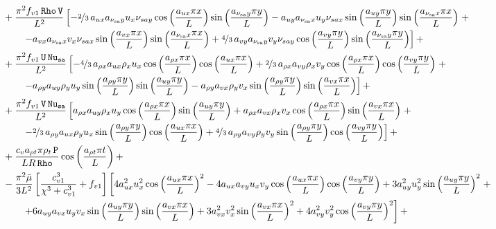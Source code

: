 \documentclass[10pt]{article}
\newcommand{\Rho}{\,\mathtt{Rho}}
\newcommand{\PP}{\,\mathtt{P}}
\newcommand{\U}{\,\mathtt{U}}
\newcommand{\V}{\,\mathtt{V}}
\newcommand{\Nu}{\,\mathtt{Nu_{sa}}}
\newcommand{\sa}{\nu_{\mathrm{sa}}}
\newcommand{\bmu}{\bar{\mu}}
\begin{document}
\begin{equation*}
\begin{split}
&+\dfrac{ \pi^2 f_{v1} \Rho \V}{L^2}\left[-\nicefrac{2}{3}\, a_{ux} a_{\sa y} u_x \nu_{sa y} \cos\left(\dfrac{a_{ux} \pi x}{L}\right) \sin\left(\dfrac{a_{\sa y} \pi y}{L}\right)-a_{uy} a_{\sa x} u_y \nu_{sa x} \sin\left(\dfrac{a_{uy} \pi y}{L}\right) \sin\left(\dfrac{a_{\sa x} \pi x}{L}\right)\right.+\\
    &\qquad\left.-a_{vx} a_{\sa x} v_x \nu_{sa x} \sin\left(\dfrac{a_{vx} \pi x}{L}\right) \sin\left(\dfrac{a_{\sa x} \pi x}{L}\right)+\nicefrac{4}{3}\, a_{vy} a_{\sa y} v_y \nu_{sa y} \cos\left(\dfrac{a_{vy} \pi y}{L}\right) \sin\left(\dfrac{a_{\sa y} \pi y}{L}\right)\right]+\\
&+\dfrac{\pi^2 f_{v1} \U \Nu}{L^2}\left[-\nicefrac{4}{3}\, a_{\rho x} a_{ux} \rho_x u_x \cos\left(\dfrac{a_{\rho x} \pi x}{L}\right) \cos\left(\dfrac{a_{ux} \pi x}{L}\right)+\nicefrac{2}{3}\, a_{\rho x} a_{vy} \rho_x v_y \cos\left(\dfrac{a_{\rho x} \pi x}{L}\right) \cos\left(\dfrac{a_{vy} \pi y}{L}\right)\right.+\\
    &\qquad\left.-a_{\rho y} a_{uy} \rho_y u_y \sin\left(\dfrac{a_{\rho y} \pi y}{L}\right) \sin\left(\dfrac{a_{uy} \pi y}{L}\right)-a_{\rho y} a_{vx} \rho_y v_x \sin\left(\dfrac{a_{\rho y} \pi y}{L}\right) \sin\left(\dfrac{a_{vx} \pi x}{L}\right)\right] +\\
&+\dfrac{\pi^2 f_{v1} \V \Nu}{L^2}\left[a_{\rho x} a_{uy} \rho_x u_y \cos\left(\dfrac{a_{\rho x} \pi x}{L}\right) \sin\left(\dfrac{a_{uy} \pi y}{L}\right)+a_{\rho x} a_{vx} \rho_x v_x \cos\left(\dfrac{a_{\rho x} \pi x}{L}\right) \sin\left(\dfrac{a_{vx} \pi x}{L}\right)\right.+\\
    &\qquad\left.-\nicefrac{2}{3}\, a_{\rho y} a_{ux} \rho_y u_x \sin\left(\dfrac{a_{\rho y} \pi y}{L}\right) \cos\left(\dfrac{a_{ux} \pi x}{L}\right)+\nicefrac{4}{3}\, a_{\rho y} a_{vy} \rho_y v_y \sin\left(\dfrac{a_{\rho y} \pi y}{L}\right) \cos\left(\dfrac{a_{vy} \pi y}{L}\right)\right] +\\
&+\dfrac{c_v a_{\rho t} \pi \rho_t \PP }{L R \Rho}\cos\left(\dfrac{a_{\rho t} \pi t}{L}\right) +\\
&-\dfrac{\pi^2 \bmu}{3L^2}\left[\dfrac{c_{v1}^3 }{\chi^3+c_{v1}^3}+f_{v1}\right] \left[4 a_{ux}^2 u_x^2 \cos\left(\dfrac{a_{ux} \pi x}{L}\right)^2-4 a_{ux} a_{vy} u_x v_y \cos\left(\dfrac{a_{ux} \pi x}{L}\right) \cos\left(\dfrac{a_{vy} \pi y}{L}\right)+3 a_{uy}^2 u_y^2 \sin\left(\dfrac{a_{uy} \pi y}{L}\right)^2\right.+\\
    &\qquad\left.+6 a_{uy} a_{vx} u_y v_x \sin\left(\dfrac{a_{uy} \pi y}{L}\right) \sin\left(\dfrac{a_{vx} \pi x}{L}\right)+3 a_{vx}^2 v_x^2 \sin\left(\dfrac{a_{vx} \pi x}{L}\right)^2+4 a_{vy}^2 v_y^2 \cos\left(\dfrac{a_{vy} \pi y}{L}\right)^2\right] +\\

\end{split}
\end{equation*}
\end{document}
